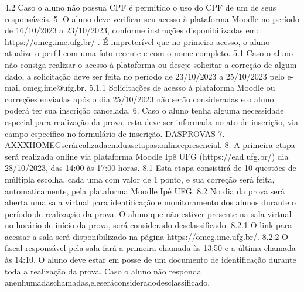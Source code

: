                       4.2 Caso o aluno não possua CPF é permitido o uso do CPF de um de seus
                      responsáveis.
                 5.   O aluno deve verificar seu acesso à plataforma Moodle no período de
                      16/10/2023     a 23/10/2023, conforme instruções disponibilizadas em:
                      https://omeg.ime.ufg.br/ . É impreterível que no primeiro acesso, o aluno
                      atualize o perfil com uma foto recente e com o nome completo.
                      5.1 Caso o aluno não consiga realizar o acesso à plataforma ou deseje
                      solicitar a correção de algum dado, a solicitação deve ser feita no período de
                      23/10/2023 a 25/10/2023 pelo e-mail omeg.ime@ufg.br.
                      5.1.1 Solicitações de acesso à plataforma Moodle ou correções enviadas
                      após o dia 25/10/2023 não serão consideradas e o aluno poderá ter sua
                      inscrição cancelada.
                 6.   Caso o aluno tenha alguma necessidade especial para realização da prova,
                      esta deve ser informada no ato de inscrição, via campo específico no
                      formulário de inscrição.
                                                     DASPROVAS
                 7.   AXXXIIOMEGserárealizadaemduasetapas:onlineepresencial.
                 8.   A primeira etapa será realizada online via plataforma Moodle Ipê UFG
                      (https://ead.ufg.br/) dia 28/10/2023, das 14:00 às 17:00 horas.
                      8.1 Esta etapa consistirá de 10 questões de múltipla escolha, cada uma com
                      valor de 1 ponto, e sua correção será feita, automaticamente, pela plataforma
                      Moodle Ipê UFG.
                      8.2 No dia da prova será aberta uma sala virtual para identificação e
                      monitoramento dos alunos durante o período de realização da prova. O
                      aluno que não estiver presente na sala virtual no horário de início da
                      prova, será considerado desclassificado.
                      8.2.1   O link para acessar a sala será disponibilizado na página
                      https://omeg.ime.ufg.br/.
                      8.2.2 O fiscal responsável pela sala fará a primeira chamada às 13:50 e a
                      última chamada às 14:10. O aluno deve estar em posse de um documento de
                      identificação durante toda a realização da prova. Caso o aluno não responda
                      anenhumadaschamadas,eleseráconsideradodesclassificado.
